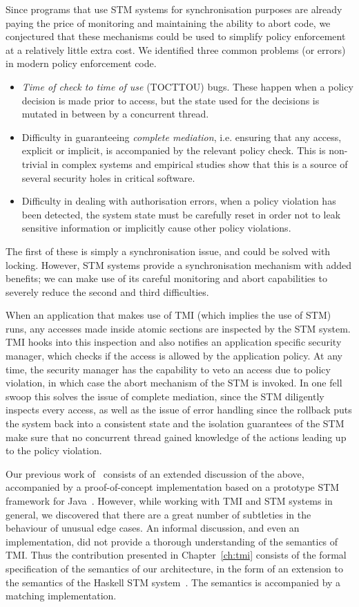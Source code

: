 Since programs that use STM systems for synchronisation purposes are already paying
the price of monitoring and maintaining the ability to abort code, we conjectured
that these mechanisms could be used to simplify policy enforcement at a relatively
little extra cost. We identified three common problems (or errors) in modern policy
enforcement code.
\begin{itemize}
    \item \emph{Time of check to time of use} (TOCTTOU) bugs. These happen when
    a policy decision is made prior to access, but the state used for the decisions
    is mutated in between by a concurrent thread.
    \item Difficulty in guaranteeing \emph{complete mediation}, i.e. ensuring that
    any access, explicit or implicit, is accompanied by the relevant policy check.
    This is non-trivial in complex systems and empirical studies show that this
    is a source of several security holes in critical software.
    \item Difficulty in dealing with authorisation errors, when a policy violation
    has been detected, the system state must be carefully reset in order not to leak
    sensitive information or implicitly cause other policy violations.
\end{itemize}
The first of these is simply a synchronisation issue, and could be solved with locking.
However, STM systems provide a synchronisation mechanism with added benefits; we
can make use of its careful monitoring and abort capabilities to severely reduce
the second and third difficulties.

When an application that makes use of TMI (which implies the use of STM) runs,
any accesses made inside atomic sections are inspected by the STM system. TMI
hooks into this inspection and also notifies an application specific security
manager, which checks if the access is allowed by the application policy. At any
time, the security manager has the capability to veto an access due to policy
violation, in which case the abort mechanism of the STM is invoked. In one fell
swoop this solves the issue of complete mediation, since the STM diligently
inspects every access, as well as the issue of error handling since the rollback
puts the system back into a consistent state and the isolation guarantees of the
STM make sure that no concurrent thread gained knowledge of the actions leading
up to the policy violation.

Our previous work of~\cite{tmi} consists of an extended discussion of the above,
accompanied by a proof-of-concept implementation based on a prototype STM framework
for Java~\cite{hlm06}. However, while working with TMI and STM systems in general,
we discovered that there are a great number of subtleties in the behaviour of
unusual edge cases. An informal discussion, and even an implementation, did not
provide a thorough understanding of the semantics of TMI. Thus the contribution
presented in Chapter~\ref{ch:tmi} consists of the formal specification of the semantics
of our architecture, in the form of an extension to the semantics of the Haskell
STM system~\cite{haskellstm}. The semantics is accompanied by a matching implementation.

